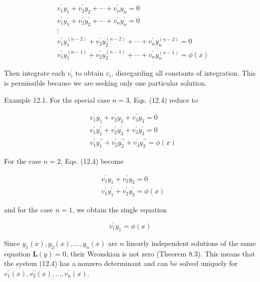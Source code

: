 \documentclass[10pt]{article}
\begin{document}
\begin{align*}
& v_{1}^{\prime} y_{1}+v_{2}^{\prime} y_{2}+\cdots+v_{n}^{\prime} y_{n}=0 \\
& v_{1}^{\prime} y_{1}^{\prime}+v_{2}^{\prime} y_{2}^{\prime}+\cdots+v_{n}^{\prime} y_{n}^{\prime}=0 \\
& \vdots \\
& v_{1}^{\prime} y_{1}^{(n-2)}+v_{2}^{\prime} y_{2}^{(n-2)}+\cdots+v_{n}^{\prime} y_{n}^{(n-2)}=0  \tag{12.4}\\
& v_{1}^{\prime} y_{1}^{(n-1)}+v_{2}^{\prime} y_{2}^{(n-1)}+\cdots+v_{n}^{\prime} y_{n}^{(n-1)}=\phi(x)
\end{align*}


Then integrate each $v_{i}^{\prime}$ to obtain $v_{i}$, disregarding all constants of integration. This is permissible because we are seeking only one particular solution.

Example 12.1. For the special case $n=3$, Eqs. (12.4) reduce to


\begin{align*}
& v_{1}^{\prime} y_{1}+v_{2}^{\prime} y_{2}+v_{3}^{\prime} y_{3}=0 \\
& v_{1}^{\prime} y_{1}^{\prime}+v_{2}^{\prime} y_{2}^{\prime}+v_{3}^{\prime} y_{3}^{\prime}=0  \tag{12.5}\\
& v_{1}^{\prime} y_{1}^{\prime \prime}+v_{2}^{\prime} y_{2}^{\prime \prime}+v_{3}^{\prime} y_{3}^{\prime \prime}=\phi(x)
\end{align*}


For the case $n=2$, Eqs. (12.4) become


\begin{align*}
& v_{1}^{\prime} y_{1}+v_{2}^{\prime} y_{2}=0 \\
& v_{1}^{\prime} y_{1}^{\prime}+v_{2}^{\prime} y_{2}^{\prime}=\phi(x) \tag{12.6}
\end{align*}


and for the case $n=1$, we obtain the single equation


\begin{equation*}
v_{1}^{\prime} y_{1}=\phi(x) \tag{12.7}
\end{equation*}


Since $y_{1}(x), y_{2}(x), \ldots, y_{n}(x)$ are $n$ linearly independent solutions of the same equation $\mathbf{L}(y)=0$, their Wronskian is not zero (Theorem 8.3). This means that the system (12.4) has a nonzero determinant and can be solved uniquely for $v_{1}^{\prime}(x), v_{2}^{\prime}(x), \ldots, v_{n}^{\prime}(x)$.
\end{document}
